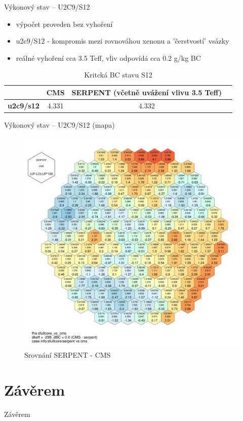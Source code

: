 \documentclass{beamer}
\begin{document}
\begin{frame}{Výkonový stav -- U2C9/S12}

\begin{itemize}\footnotesize
	\item výpočet proveden bez vyhoření 
	\item u2c9/S12 - kompromis mezi rovnováhou xenonu a 'čerstvostí' vsázky
	\item reálné vyhoření cca 3.5 Teff, vliv odpovídá cca 0.2 g/kg BC
\end{itemize}
	
\begin{table}[h]\scriptsize
	\begin{center}
		\begin{tabular}{cccc}
			\toprule
			& CMS     & SERPENT (\tiny včetně uvážení vlivu 3.5 Teff) \\
			\midrule
			\textbf{u2c9/s12  } & 4.331    & 4.332    \\
			\bottomrule
		\end{tabular}
		\caption{\footnotesize Kritcká BC stavu S12}
	\end{center}
\end{table}
\end{frame}






\begin{frame}{Výkonový stav -- U2C9/S12 (mapa)}
\begin{figure}[!h]
	\centering
	\includegraphics[scale=0.08]{img/fha_sfullcore_vs_cms.pdf}
	\caption{Srovnání SERPENT - CMS}
\end{figure}
\end{frame}



\section{Závěrem}

\begin{frame}{Závěrem}


\end{frame}
\end{document}
